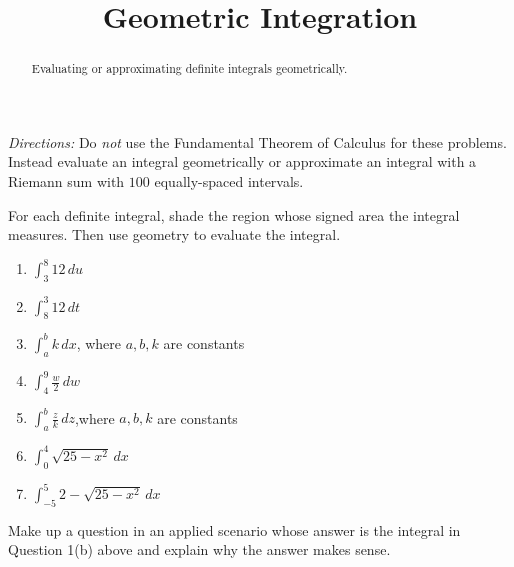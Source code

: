 \documentclass{ximera}
\title{Geometric Integration}
\begin{document}
\begin{abstract}
Evaluating or approximating definite integrals geometrically.
\end{abstract}
\maketitle


\emph{Directions:} Do \emph{not} use the Fundamental Theorem of Calculus for these problems. Instead evaluate an integral geometrically or approximate an integral with a Riemann sum with $100$ equally-spaced intervals.

\begin{question} \label{QOOOREfbxx3er}
For each definite integral, shade the region whose signed area the integral measures. Then use geometry to evaluate the integral.

\begin{enumerate}

\item $\int_3^8 12 \, du$

\item $\int_8^3 12 \, dt$

\item $\int_a^b k \, dx$, where $a,b,k$ are constants

\item $\int_4^9 \frac{w}{2} \, dw$

\item $\int_a^b \frac{z}{k} \, dz$,where $a,b,k$ are constants

\item $\int_0^4 \sqrt{25-x^2}\, dx$

\item $\int_{-5}^5 2-\sqrt{25-x^2}\, dx$

\end{enumerate} 
\end{question}

\begin{question}  \label{QPPlDlfe343421}
Make up a question in an applied scenario whose answer is the integral in Question 1(b) above and explain why the answer makes sense.
\end{question}
\end{document}
